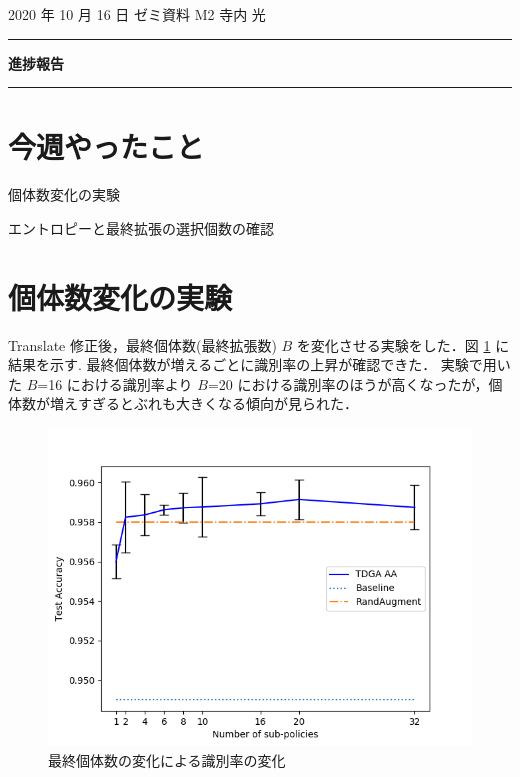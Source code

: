 \documentclass[onecolumn]{ujarticle}   %
\begin{document}
	\noindent

	\hspace{1em}
	2020 年 10 月 16 日
	ゼミ資料
	\hfill
	M2 寺内 光

	\vspace{2mm}

	\hrule

	\begin{center}
		{\Large \bf 進捗報告}
	\end{center}

	\hrule
	\vspace{3mm}

	\section{今週やったこと}
	\begin{itemize}{
    \item{個体数変化の実験}
    \item{エントロピーと最終拡張の選択個数の確認}
	}\end{itemize}

  \section{個体数変化の実験}
  Translate 修正後，最終個体数(最終拡張数) $B$ を変化させる実験をした．図 \ref{fig:change_B} に結果を示す.
  最終個体数が増えるごとに識別率の上昇が確認できた． 実験で用いた $B$=16 における識別率より $B$=20 における識別率のほうが高くなったが，個体数が増えすぎるとぶれも大きくなる傾向が見られた．

  \begin{figure}[ht]
    \begin{center}
      \includegraphics[width=0.7\columnwidth]{figure/exp_change_B.png}
      \caption{最終個体数の変化による識別率の変化}
      \label{fig:change_B}
    \end{center}
  \end{figure}
\end{document}
